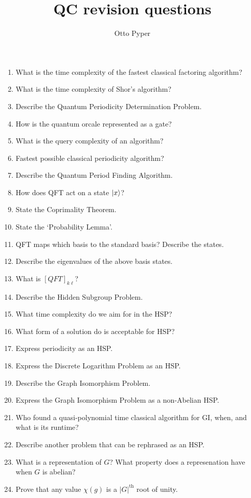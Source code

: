 \documentclass[]{article}
\date{}
\author{Otto Pyper}
\title{QC revision questions}
\begin{document}
\maketitle

\begin{enumerate}
    \item What is the time complexity of the fastest classical factoring algorithm?
    \item What is the time complexity of Shor's algorithm?
    \item Describe the Quantum Periodicity Determination Problem.
    \item How is the quantum orcale represented as a gate?
    \item What is the query complexity of an algorithm?
    \item Fastest possible classical periodicity algorithm?
    \item Describe the Quantum Period Finding Algorithm.
    \item How does QFT act on a state $\lvert x\rangle$?
    \item State the Coprimality Theorem.
    \item State the `Probability Lemma'.
    \item QFT maps which basis to the standard basis? Describe the states.
    \item Describe the eigenvalues of the above basis states.
    \item What is $[QFT]_{k\ell}$?
    \item Describe the Hidden Subgroup Problem.
    \item What time complexity do we aim for in the HSP?
    \item What form of a solution do is acceptable for HSP?
    \item Express periodicity as an HSP.
    \item Express the Discrete Logarithm Problem as an HSP.
    \item Describe the Graph Isomorphism Problem.
    \item Express the Graph Isomorphism Problem as a non-Abelian HSP.
    \item Who found a quasi-polynomial time classical algorithm for GI, when, and what is its runtime?
    \item Describe another problem that can be rephrased as an HSP.
    \item What is a representation of $G$? What property does a represenation have when $G$ is abelian?
    \item Prove that any value $\chi(g)$ is a $|G|^{\textrm{th}}$ root of unity.

\end{enumerate}
\end{document}
